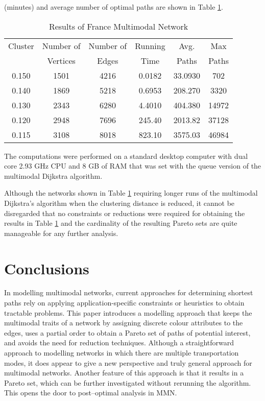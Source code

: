 \documentclass[preprint,authoryear,12pt]{elsarticle}
\begin{document}
(minutes) and average number of optimal paths are shown in Table \ref{FranceResults}.
\begin{table}
\caption{Results of France Multimodal Network}\label{FranceResults}
\vspace{-0.1cm}
\begin{center}
\begin{tabular}{cccccc}\hline
  Cluster  &  Number of & Number of & Running & Avg.    & Max                \\
           &  Vertices  & Edges     & Time    & Paths   & Paths              \\ \hline 
  0.150    &  1501      & 4216      & 0.0182   & 33.0930  & 702              \\
  0.140    &  1869      & 5218      & 0.6953   & 208.270  & 3320               \\
  0.130    &  2343      & 6280      & 4.4010   & 404.380  & 14972                \\
  0.120    &  2948      & 7696      & 245.40   & 2013.82  & 37128                  \\
  0.115    &  3108      & 8018      & 823.10   & 3575.03  & 46984                 \\
   \hline
\end{tabular}
\end{center}
\label{FranceResults}
\end{table}
The computations were performed on a standard desktop computer with dual core
2.93 GHz CPU and 8 GB of RAM that was set with the queue version of the
multimodal Dijkstra algorithm.

Although the networks shown in Table \ref{FranceResults} requiring longer
runs of the multimodal Dijkstra's algorithm when the clustering distance
is reduced, it cannot be disregarded that no constraints or reductions were
required for obtaining the results in Table \ref{FranceResults} and the
cardinality of the resulting Pareto sets are quite manageable for any
further analysis.  

\section{Conclusions}

In modelling multimodal networks, current approaches for determining shortest
paths rely on applying application-specific constraints or heuristics to
obtain tractable problems.
This paper introduces a modelling approach that keeps the multimodal
traits of a network by assigning discrete colour attributes to the
edges, uses a partial order to obtain a Pareto set of paths of potential interest,
and avoids the need for reduction techniques.
Although a straightforward approach to modelling networks in which there
are multiple transportation modes, it does appear to give a new perspective
and truly general approach for multimodal networks.
Another feature of this approach is that it results in a Pareto
set, which can be further investigated without rerunning the
algorithm. This opens the door to post--optimal analysis in MMN.
\end{document}
